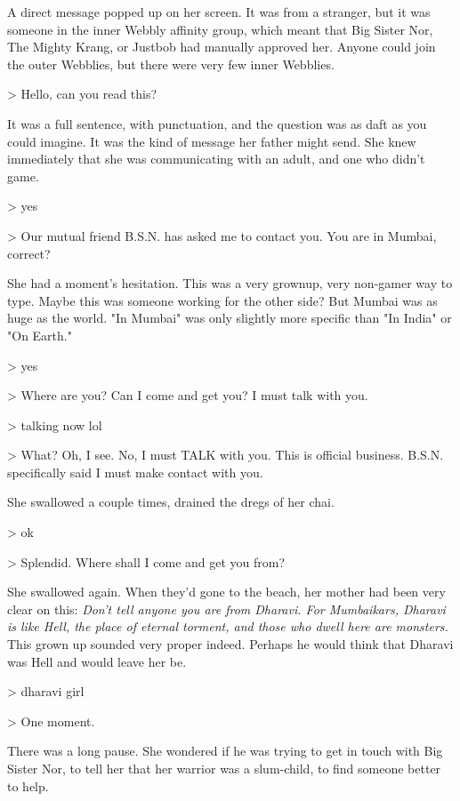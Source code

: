 A direct message popped up on her screen. It was from a stranger,
but it was someone in the inner Webbly affinity group, which meant
that Big Sister Nor, The Mighty Krang, or Justbob had manually
approved her. Anyone could join the outer Webblies, but there were
very few inner Webblies.

\textgreater{} Hello, can you read this?

It was a full sentence, with punctuation, and the question was as
daft as you could imagine. It was the kind of message her father
might send. She knew immediately that she was communicating with an
adult, and one who didn't game.

\textgreater{} yes

\textgreater{} Our mutual friend B.S.N. has asked me to contact
you. You are in Mumbai, correct?

She had a moment's hesitation. This was a very grownup, very
non-gamer way to type. Maybe this was someone working for the other
side? But Mumbai was as huge as the world. "In Mumbai" was only
slightly more specific than "In India" or "On Earth."

\textgreater{} yes

\textgreater{} Where are you? Can I come and get you? I must talk
with you.

\textgreater{} talking now lol

\textgreater{} What? Oh, I see. No, I must TALK with you. This is
official business. B.S.N. specifically said I must make contact
with you.

She swallowed a couple times, drained the dregs of her chai.

\textgreater{} ok

\textgreater{} Splendid. Where shall I come and get you from?

She swallowed again. When they'd gone to the beach, her mother had
been very clear on this:
\emph{Don't tell anyone you are from Dharavi. For Mumbaikars, Dharavi is like Hell, the place of eternal torment, and those who dwell here are monsters.}
This grown up sounded very proper indeed. Perhaps he would think
that Dharavi was Hell and would leave her be.

\textgreater{} dharavi girl

\textgreater{} One moment.

There was a long pause. She wondered if he was trying to get in
touch with Big Sister Nor, to tell her that her warrior was a
slum-child, to find someone better to help.

